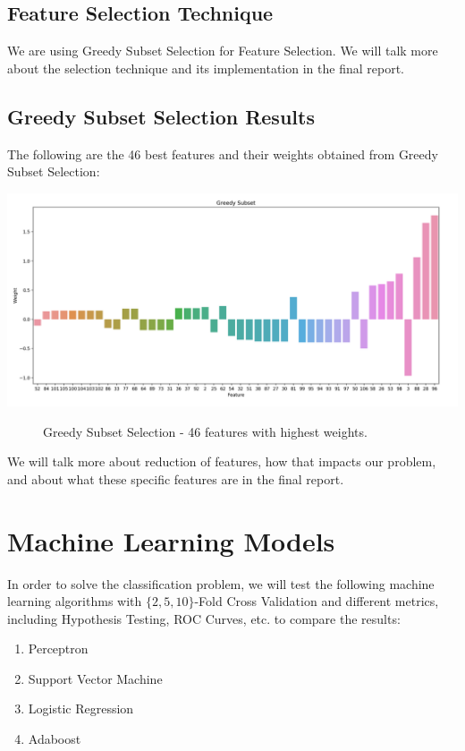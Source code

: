 \documentclass[fleqn]{article}
\begin{document}
    \subsection{Feature Selection Technique}
    We are using Greedy Subset Selection for Feature Selection. We will talk more about
    the selection technique and its implementation in the final report.

    \subsection{Greedy Subset Selection Results}
    The following are the 46 best features and their weights obtained from Greedy Subset
    Selection:

    \begin{center}
        \includegraphics[scale=0.27]{46.png}
        \begin{figure}[!h]
            \caption{Greedy Subset Selection - 46 features with highest weights.}
        \end{figure}
    \end{center}


    We will talk more about reduction of features, how that impacts our problem,
    and about what these specific features are in the final report.

    \section{Machine Learning Models}

    In order to solve the classification problem,
    we will test the following machine learning algorithms with $ \{2, 5, 10\} $-Fold Cross
    Validation and different metrics, including Hypothesis Testing, ROC Curves, etc.
    to compare the results:
    \begin{enumerate}
        \item Perceptron
        \item Support Vector Machine
        \item Logistic Regression
        \item Adaboost
    \end{enumerate}
\end{document}
